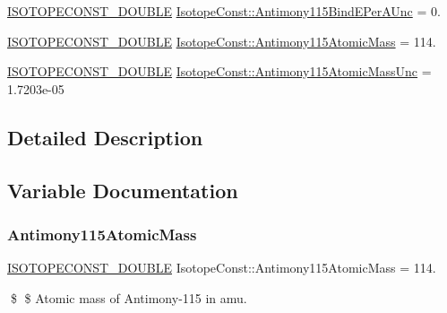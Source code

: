 \begin{DoxyCompactItemize}
\mbox{\hyperlink{group___isotope_const-_macros_ga8f45a7272ce02c0b4c65c44636ed719a}{I\+S\+O\+T\+O\+P\+E\+C\+O\+N\+S\+T\+\_\+\+D\+O\+U\+B\+LE}} \mbox{\hyperlink{group___isotope_const-_antimony-_sb115_gac37ba3a0ed2941f88ee9b0a1529f3d77}{Isotope\+Const\+::\+Antimony115\+Bind\+E\+Per\+A\+Unc}} = 0.
\item 
\mbox{\hyperlink{group___isotope_const-_macros_ga8f45a7272ce02c0b4c65c44636ed719a}{I\+S\+O\+T\+O\+P\+E\+C\+O\+N\+S\+T\+\_\+\+D\+O\+U\+B\+LE}} \mbox{\hyperlink{group___isotope_const-_antimony-_sb115_gac0090abedd6bdbc30c06a3b7b7ad9eec}{Isotope\+Const\+::\+Antimony115\+Atomic\+Mass}} = 114.
\item 
\mbox{\hyperlink{group___isotope_const-_macros_ga8f45a7272ce02c0b4c65c44636ed719a}{I\+S\+O\+T\+O\+P\+E\+C\+O\+N\+S\+T\+\_\+\+D\+O\+U\+B\+LE}} \mbox{\hyperlink{group___isotope_const-_antimony-_sb115_ga9ffde4c78992809d9a16efad56fa4c92}{Isotope\+Const\+::\+Antimony115\+Atomic\+Mass\+Unc}} = 1.\+7203e-\/05
\end{DoxyCompactItemize}


\subsection{Detailed Description}


\subsection{Variable Documentation}
\mbox{\label{group___isotope_const-_antimony-_sb115_gac0090abedd6bdbc30c06a3b7b7ad9eec}} 
\subsubsection{\texorpdfstring{Antimony115\+Atomic\+Mass}{Antimony115AtomicMass}}
{\footnotesize\ttfamily \mbox{\hyperlink{group___isotope_const-_macros_ga8f45a7272ce02c0b4c65c44636ed719a}{I\+S\+O\+T\+O\+P\+E\+C\+O\+N\+S\+T\+\_\+\+D\+O\+U\+B\+LE}} Isotope\+Const\+::\+Antimony115\+Atomic\+Mass = 114.}

\$ \$ Atomic mass of Antimony-\/115 in amu. \mbox{\label{group___isotope_const-_antimony-_sb115_ga9ffde4c78992809d9a16efad56fa4c92}} 
